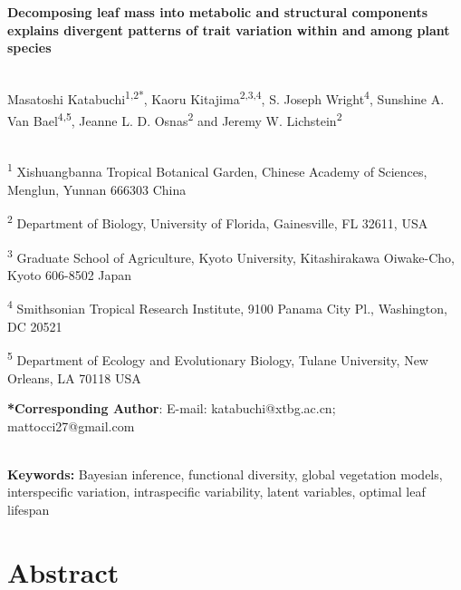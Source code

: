\documentclass[
  12pt,
  letterpaper,
  DIV=11,
  numbers=noendperiod]{scrartcl}
\author{}
\date{}
\begin{document}
\ifdefined\Shaded\renewenvironment{Shaded}{\begin{tcolorbox}[boxrule=0pt, interior hidden, breakable, borderline west={3pt}{0pt}{shadecolor}, enhanced, sharp corners, frame hidden]}{\end{tcolorbox}}\fi

\textbf{Decomposing leaf mass into metabolic and structural components
explains divergent patterns of trait variation within and among plant
species}\\
\strut \\
Masatoshi Katabuchi\textsuperscript{1,2*}, Kaoru
Kitajima\textsuperscript{2,3,4}, S. Joseph Wright\textsuperscript{4},
Sunshine A. Van Bael\textsuperscript{4,5}, Jeanne L. D.
Osnas\textsuperscript{2} and Jeremy W. Lichstein\textsuperscript{2}\\
\strut \\
\textsuperscript{1} Xishuangbanna Tropical Botanical Garden, Chinese
Academy of Sciences, Menglun, Yunnan 666303 China

\textsuperscript{2} Department of Biology, University of Florida,
Gainesville, FL 32611, USA

\textsuperscript{3} Graduate School of Agriculture, Kyoto University,
Kitashirakawa Oiwake-Cho, Kyoto 606-8502 Japan

\textsuperscript{4} Smithsonian Tropical Research Institute, 9100 Panama
City Pl., Washington, DC 20521

\textsuperscript{5} Department of Ecology and Evolutionary Biology,
Tulane University, New Orleans, LA 70118 USA

\textbf{*Corresponding Author}: E-mail: katabuchi@xtbg.ac.cn;
mattocci27@gmail.com\\
\strut \\
\textbf{Keywords:} Bayesian inference, functional diversity, global
vegetation models, interspecific variation, intraspecific variability,
latent variables, optimal leaf lifespan

\hypertarget{abstract}{%
\section{Abstract}\label{abstract}}
\end{document}
